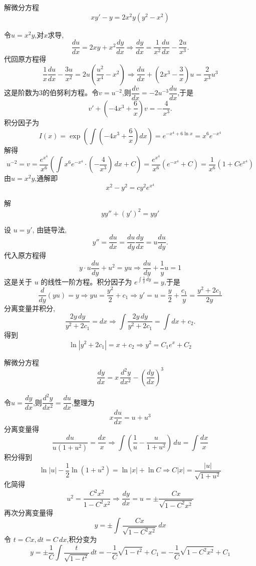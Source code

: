 \begin{questions}
    \question 解微分方程
    \[
    xy' - y = 2x^2 y(y^2 - x^2)
    \]
    \begin{solution}
        令$u = x^2y$,对$x$求导,
        \[
        \frac{du}{dx} = 2xy + x^2\frac{dy}{dx} \Rightarrow
        \frac{dy}{dx} = \frac{1}{x^2}\frac{du}{dx} - \frac{2u}{x^3}.
        \]
        代回原方程得
        \[
        \frac{1}{x} \frac{du}{dx} - \frac{3u}{x^2} = 2u \left(\frac{u^2}{x^4} - x^2\right) \Rightarrow \frac{du}{dx} + \left(2x^3 - \frac{3}{x}\right) u = \frac{2}{x^3} u^3
        \]
        这是阶数为3的伯努利方程。令$v = u^{-2}$,则$\dfrac{dv}{dx} = -2u^{-3}\dfrac{du}{dx}$,于是
        \[
        v' + \left(-4x^3 + \frac{6}{x}\right)v = -\frac{4}{x^3}.
        \]
        积分因子为
        \[
        I(x) = \exp\left(\int \left(-4x^3 + \frac{6}{x}\right) dx\right) = e^{-x^4 + 6 \ln x} = x^6 e^{-x^4}
        \]
        解得
        \[
        u^{-2} = v = \frac{e^{x^4}}{x^6}\left(\int x^6 e^{-x^4} \cdot \left(-\frac{4}{x^3}\right)\,dx+C\right) =\frac{e^{x^4}}{x^6}\left(e^{-x^4}+C\right)= \frac{1}{x^6}(1 + Ce^{x^4})
        \]
        由$u = x^2y$,通解即
        \[
        x^2 - y^2 = cy^2 e^{x^4}
        \]
    \end{solution}

    \question 解 
    \[
    y y'' + (y')^2 = y y'
    \]
    \begin{solution}
        设 $u=y'$, 由链导法,
        \[
        y''=\frac{du}{dx}=\frac{du}{dy}\frac{dy}{dx}=u\frac{du}{dy}.
        \]
        代入原方程得
        \[
        y\cdot u\frac{du}{dy} + u^2 = y u \Rightarrow \frac{du}{dy} + \frac{1}{y}u = 1
        \]
        这是关于 $u$ 的线性一阶方程。积分因子为 $e^{\int \frac{1}{y}\,dy}=y$,于是
        \[
        \frac{d}{dy}(y u) = y \Rightarrow y u = \frac{y^2}{2} + c_1 \Rightarrow y'=u=\frac{y}{2} + \frac{c_1}{y} = \frac{y^2+2c_1}{2y}
        \]
        分离变量并积分,
        \[
        \frac{2y\,dy}{y^2+2c_1} = dx \Rightarrow
        \int \frac{2y\,dy}{y^2+2c_1} = \int dx + c_2.
        \]
        得到
        \[
        \ln|y^2+2c_1| = x + c_2 \Rightarrow y^2 = C_1 e^{x} + C_2
        \]
    \end{solution}

    \question 解微分方程
    \[
    \frac{dy}{dx} = x \,\frac{d^2y}{dx^2} - \left(\frac{dy}{dx}\right)^3
    \]
    \begin{solution}
        令$u=\dfrac{dy}{dx}$,则$\dfrac{d^2y}{dx^2}=\dfrac{du}{dx}$,整理为
        \[
        x\frac{du}{dx} = u + u^3
        \]
        分离变量得
        \[
        \frac{du}{u(1+u^2)} = \frac{dx}{x} \Rightarrow \int\left(\frac{1}{u}-\frac{u}{1+u^2}\right)\,du=\int\frac{dx}{x}
        \]
        积分得到
        \[
        \ln|u| -\frac{1}{2}\ln(1+u^2)=\ln|x| + \ln C \Rightarrow C|x|=\frac{|u|}{\sqrt{1+u^2}}
        \]
        化简得
        \[
        u^2 = \frac{C^2 x^2}{1 - C^2 x^2} \Rightarrow \frac{dy}{dx}= u = \pm \frac{C x}{\sqrt{1 - C^2 x^2}}
        \]
        再次分离变量得
        \[
        y= \pm \int \frac{C x}{\sqrt{1 - C^2 x^2}}\,dx 
        \]
        令 $t=Cx,dt=C\,dx$,积分变为
        \[
        y=\pm \frac{1}{C}\int \frac{t}{\sqrt{1-t^2}}\,dt 
        = -\frac{1}{C}\sqrt{1-t^2} + C_1 = -\frac{1}{C}\sqrt{1 - C^2 x^2} + C_1
        \]
    \end{solution}


\end{questions}
